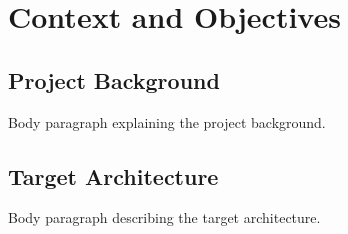 \documentclass[11pt,a4paper]{article}
\begin{document}
\section{Context and Objectives}

\subsection{Project Background}

Body paragraph explaining the project background.

\subsection{Target Architecture}

Body paragraph describing the target architecture.
\end{document}

